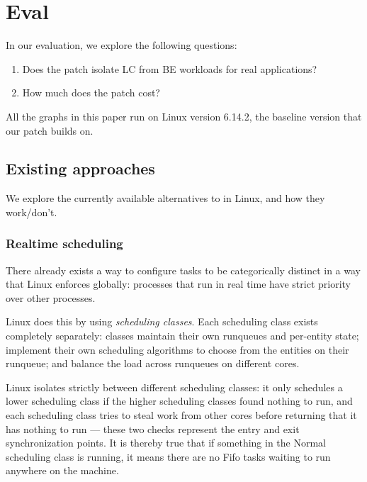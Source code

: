 \section{Eval}
\label{s:eval}

In our evaluation, we explore the following questions:
\begin{enumerate}
    \item Does the patch isolate LC from BE workloads for real applications?
    \item How much does the patch cost?
\end{enumerate}

All the graphs in this paper run on Linux version 6.14.2, the baseline version
that our patch builds on.

\subsection{Existing approaches}

We explore the currently available alternatives to \cgroups{} in Linux, and how
they work/don't.

\subsubsection{Realtime scheduling}

There already exists a way to configure tasks to be categorically distinct in a
way that Linux enforces globally: processes that run in real time have strict
priority over other processes.

Linux does this by using \textit{scheduling classes}. Each scheduling class
exists completely separately: classes maintain their own runqueues and
per-entity state; implement their own scheduling algorithms to choose from the
entities on their runqueue; and balance the load across runqueues on different
cores.

Linux isolates strictly between different scheduling classes: it only schedules
a lower scheduling class if the higher scheduling classes found nothing to run,
and each scheduling class tries to steal work from other cores before returning
that it has nothing to run --- these two checks represent the entry and exit
synchronization points. It is thereby true that if something in the Normal
scheduling class is running, it means there are no Fifo tasks waiting to run
anywhere on the machine.

